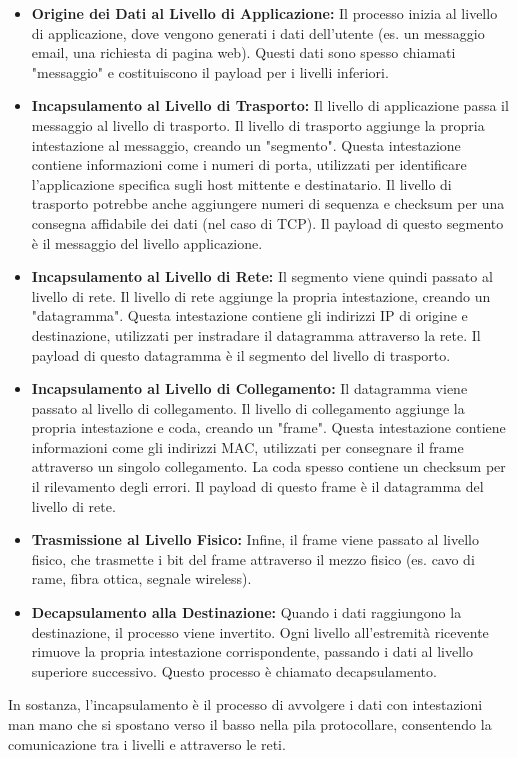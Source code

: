 \begin{itemize}
    \item \textbf{Origine dei Dati al Livello di Applicazione:} Il processo inizia al livello di applicazione, dove vengono generati i dati dell'utente (es. un messaggio email, una richiesta di pagina web). Questi dati sono spesso chiamati "messaggio" e costituiscono il payload per i livelli inferiori.
    \item \textbf{Incapsulamento al Livello di Trasporto:} Il livello di applicazione passa il messaggio al livello di trasporto. Il livello di trasporto aggiunge la propria intestazione al messaggio, creando un "segmento". Questa intestazione contiene informazioni come i numeri di porta, utilizzati per identificare l'applicazione specifica sugli host mittente e destinatario. Il livello di trasporto potrebbe anche aggiungere numeri di sequenza e checksum per una consegna affidabile dei dati (nel caso di TCP). Il payload di questo segmento è il messaggio del livello applicazione.
    \item \textbf{Incapsulamento al Livello di Rete:} Il segmento viene quindi passato al livello di rete. Il livello di rete aggiunge la propria intestazione, creando un "datagramma". Questa intestazione contiene gli indirizzi IP di origine e destinazione, utilizzati per instradare il datagramma attraverso la rete. Il payload di questo datagramma è il segmento del livello di trasporto.
    \item \textbf{Incapsulamento al Livello di Collegamento:} Il datagramma viene passato al livello di collegamento. Il livello di collegamento aggiunge la propria intestazione e coda, creando un "frame". Questa intestazione contiene informazioni come gli indirizzi MAC, utilizzati per consegnare il frame attraverso un singolo collegamento. La coda spesso contiene un checksum per il rilevamento degli errori. Il payload di questo frame è il datagramma del livello di rete.
    \item \textbf{Trasmissione al Livello Fisico:} Infine, il frame viene passato al livello fisico, che trasmette i bit del frame attraverso il mezzo fisico (es. cavo di rame, fibra ottica, segnale wireless).
    \item \textbf{Decapsulamento alla Destinazione:} Quando i dati raggiungono la destinazione, il processo viene invertito. Ogni livello all'estremità ricevente rimuove la propria intestazione corrispondente, passando i dati al livello superiore successivo. Questo processo è chiamato decapsulamento.
\end{itemize}

In sostanza, l'incapsulamento è il processo di avvolgere i dati con intestazioni man mano che si spostano verso il basso nella pila protocollare, consentendo la comunicazione tra i livelli e attraverso le reti. 

